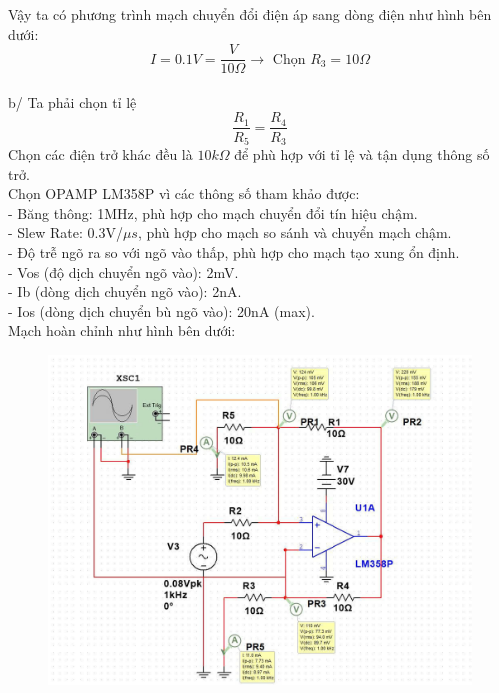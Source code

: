Vậy ta có phương trình mạch chuyển đổi điện áp sang dòng điện như hình bên dưới:\\
\begin{equation*}
    \boxed{I = 0.1V = \dfrac{V}{10\Omega}}
    \rightarrow \text{ Chọn } R_3 = 10\Omega
\end{equation*}
\\
b/ Ta phải chọn tỉ lệ
\begin{equation*}
    \dfrac{R_1}{R_5} = \dfrac{R_4}{R_3}
\end{equation*}
Chọn các điện trở khác đều là $10k\Omega$ để phù hợp với tỉ lệ và tận dụng thông số trở.\\
Chọn OPAMP LM358P vì các thông số tham khảo được: \\
- Băng thông: 1MHz, phù hợp cho mạch chuyển đổi tín hiệu chậm.\\
- Slew Rate: 0.3V/$\mu s$, phù hợp cho mạch so sánh và chuyển mạch chậm.\\
- Độ trễ ngõ ra so với ngõ vào thấp, phù hợp cho mạch tạo xung ổn định.\\
- Vos (độ dịch chuyển ngõ vào): 2mV.\\
- Ib (dòng dịch chuyển ngõ vào): 2nA.\\
- Ios (dòng dịch chuyển bù ngõ vào): 20nA (max).\\
Mạch hoàn chỉnh như hình bên dưới:
\begin{figure}[H]
    \centering
    \includegraphics[scale=0.4]{image/C9.png}
\end{figure}

